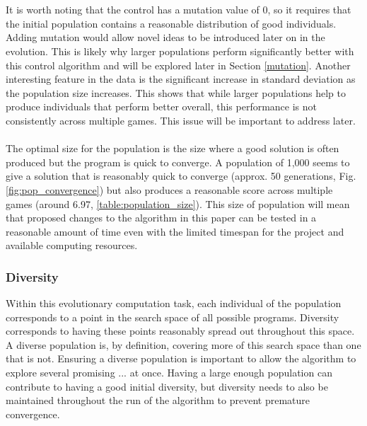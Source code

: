 \documentclass{article}
\begin{document}
\\\\
It is worth noting that the control has a mutation value of 0, so it requires that the initial population contains a reasonable distribution of good individuals. Adding mutation would allow novel ideas to be introduced later on in the evolution. This is likely why larger populations perform significantly better with this control algorithm and will be explored later in Section \ref{mutation}. Another interesting feature in the data is the significant increase in standard deviation as the population size increases. This shows that while larger populations help to produce individuals that perform better overall, this performance is not consistently across multiple games. This issue will be important to address later.
\\\\
The optimal size for the population is the size where a good solution is often produced but the program is quick to converge\cite{optimal_population_size}. A population of 1,000 seems to give a solution that is reasonably quick to converge (approx. 50 generations, Fig. \ref{fig:pop_convergence}) but also produces a reasonable score across multiple games (around 6.97, \ref{table:population_size}). This size of population will mean that proposed changes to the algorithm in this paper can be tested in a reasonable amount of time even with the limited timespan for the project and available computing resources.

\subsubsection{Diversity}
Within this evolutionary computation task, each individual of the population corresponds to a point in the search space of all possible programs. Diversity corresponds to having these points reasonably spread out throughout this space. A diverse population is, by definition, covering more of this search space than one that is not. Ensuring a diverse population is important to allow the algorithm to explore several promising ... at once\cite{diversity_recommended}. Having a large enough population can contribute to having a good initial diversity, but diversity needs to also be maintained throughout the run of the algorithm to prevent premature convergence.
\end{document}
